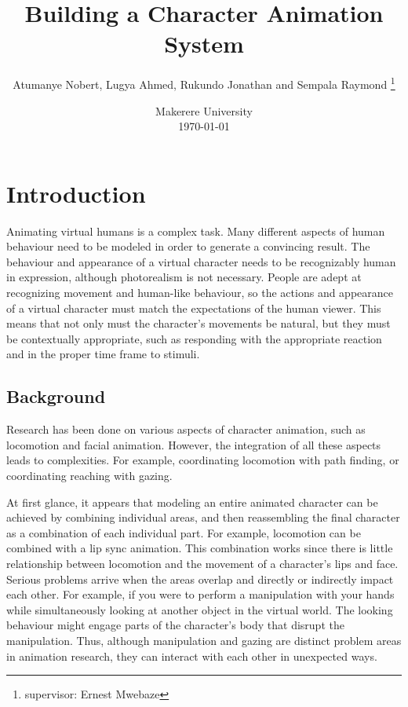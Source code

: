 \documentclass[options]{article}
\title{Building a Character Animation System}
\author{Atumanye Nobert, Lugya Ahmed, Rukundo Jonathan and Sempala Raymond \thanks{supervisor: Ernest Mwebaze}}
\date{%
    Makerere University\\%
    \today
}
\begin{document}
\begin{titlepage}
\maketitle
\end{titlepage}





\section{\textbf{ Introduction}} 
Animating virtual humans is a complex task. Many different aspects of human behaviour need to be modeled in order to generate a convincing result. The behaviour and appearance of a virtual character needs to be recognizably human in expression, although photorealism is not necessary. \bigbreak People are adept at recognizing movement and human-like behaviour, so the actions and appearance of a virtual character must match the expectations of the human viewer. This means that not only must the character's movements be natural, but they must be contextually appropriate, such as responding with the appropriate reaction and in the proper time frame to stimuli. 


\subsection{\textbf{Background}}
Research has been done on various aspects of character animation, such as locomotion and facial animation. However, the integration of all these aspects leads to complexities. For example, coordinating locomotion with path finding, or coordinating reaching with gazing.\bigbreak

At first glance, it appears that modeling an entire animated character can be achieved by combining individual areas, and then reassembling the final character as a combination of each individual part. For example, locomotion can be combined with a lip sync animation. This combination works since there is little relationship between locomotion and the movement of a character’s lips and face. Serious problems arrive when the areas overlap and directly or indirectly impact each other. For example, if you were to perform a manipulation with your hands while simultaneously looking at another object in the virtual world. The looking behaviour might engage parts of the character’s body that disrupt the manipulation. Thus, although manipulation and gazing are distinct problem areas in animation research, they can interact with each other in unexpected ways.
\end{document}
